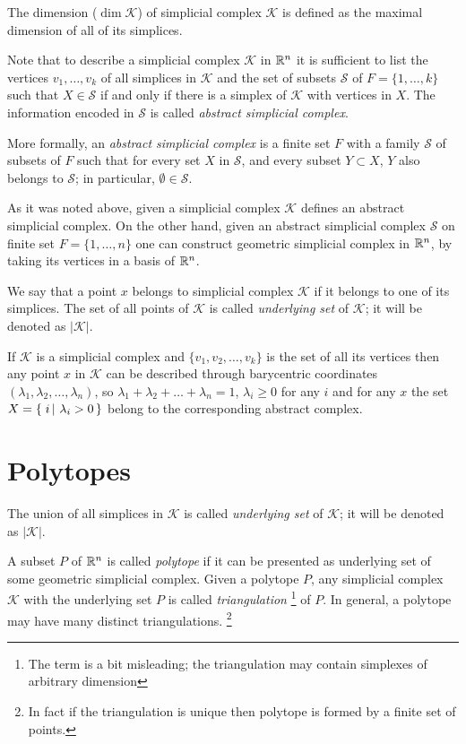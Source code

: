 The dimension ($\dim \mathcal{K}$) of simplicial complex $\mathcal{K}$ is defined as the maximal dimension of all of its simplices.

Note that to describe a simplicial complex $\mathcal{K}$ in $\mathbb{R}^n$ 
it is sufficient to list the vertices $v_1,\dots, v_k$ of all simplices in $\mathcal{K}$
and the set of subsets $\mathcal{S}$ of $F=\{1,\dots,k\}$ 
such that $X\in \mathcal{S}$ if and only if there is a simplex of $\mathcal{K}$ with vertices in $X$.
The information encoded in $\mathcal{S}$ is called \emph{abstract simplicial complex}.

More formally, an \emph{abstract simplicial complex} 
is a finite set $F$
with a family $\mathcal{S}$ of subsets of $F$
such that for every set $X$ in $\mathcal{S}$, 
and every subset $Y\subset  X$, 
$Y$ also belongs to $\mathcal{S}$;
in particular, $\emptyset\in  \mathcal{S}$.

As it was noted above, 
given a simplicial complex $\mathcal{K}$
defines an abstract simplicial complex.
On the other hand, 
given an abstract simplicial complex $\mathcal{S}$ on finite set $F=\{1,\dots,n\}$ 
one can construct geometric simplicial complex
in $\mathbb{R}^n$, by taking its vertices in a basis of $\mathbb{R}^n$.

We say that a point $x$ belongs to simplicial complex $\mathcal{K}$ if it belongs to one of its simplices.
The set of all points of  $\mathcal{K}$ is called \emph{underlying set} of $\mathcal{K}$;
it will be denoted as $|\mathcal{K}|$.

If $\mathcal{K}$ is a simplicial complex
and $\{v_1,v_2,\dots,v_k\}$ is the set of all its vertices
then any point $x$ in $\mathcal{K}$ can be described 
through barycentric coordinates $(\lambda_1,\lambda_2,\dots,\lambda_n)$, so $\lambda_1+\lambda_2+\dots+\lambda_n=1$,
$\lambda_i\ge 0$ for any $i$ and 
for any $x$ the set $X=\set{i}{\lambda_i>0}$
belong to the corresponding abstract complex. 

\section{Polytopes}

The union of all simplices in $\mathcal{K}$ is called \emph{underlying set} of $\mathcal{K}$;
it will be denoted as $|\mathcal{K}|$.

A subset $P$ of $\mathbb{R}^n$ is called \emph{polytope} if it can be presented as 
underlying set of some geometric simplicial complex.
Given a polytope $P$,
any simplicial complex $\mathcal{K}$ with the underlying set $P$ is called \emph{triangulation}%
\footnote{The term is a bit misleading; 
the triangulation may contain simplexes of arbitrary dimension}
of $P$.
In general, a polytope may have many distinct triangulations.%
\footnote{In fact if the triangulation is unique then polytope is formed by a finite set of points.} 

